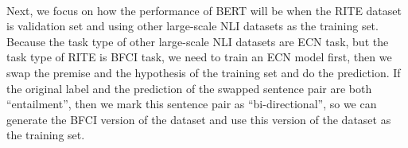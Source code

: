 \documentclass{article}
\begin{document}
\begin{CJK*}{UTF8}{bkai}
\paragraph{}
Next, we focus on how the performance of BERT will be when the RITE dataset is validation set and using other large-scale NLI datasets as the training set. Because the task type of other large-scale NLI datasets are ECN task, but the task type of RITE is BFCI task, we need to train an ECN model first, then we swap the premise and the hypothesis of the training set and do the prediction. If the original label and the prediction of the swapped sentence pair are both ``entailment'', then we mark this sentence pair as ``bi-directional'', so we can generate the BFCI version of the dataset and use this version of the dataset as the training set.


\end{CJK*}
\end{document}
